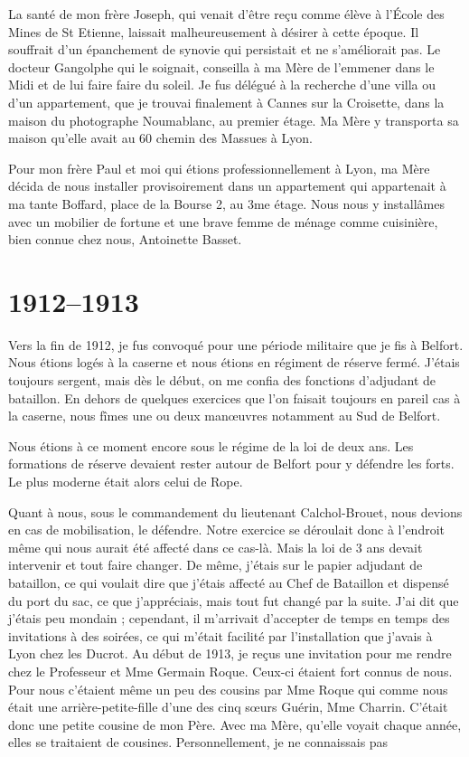 \documentclass[11pt,a4paper]{report}
\begin{document}
La santé de mon frère Joseph, qui venait d'être reçu comme élève à l'École des Mines de St Etienne, laissait malheureusement à désirer à cette époque. Il souffrait d'un épanchement de synovie qui persistait et ne s'améliorait pas. Le docteur Gangolphe qui le soignait, conseilla à ma Mère de l'emmener dans le Midi et de lui faire faire du soleil. Je fus délégué à la recherche d'une villa ou d'un appartement, que je trouvai finalement à Cannes sur la Croisette, dans la maison du photographe Noumablanc, au premier étage. Ma Mère y transporta sa maison qu'elle avait au 60 chemin des Massues à Lyon.

Pour mon frère Paul et moi qui étions professionnellement à Lyon, ma Mère décida de nous installer provisoirement dans un appartement qui appartenait à ma tante Boffard, place de la Bourse 2, au 3me étage. Nous nous y installâmes avec un mobilier de fortune et une brave femme de ménage comme cuisinière, bien connue chez nous, Antoinette Basset.

\chapter{1912--1913}

Vers la fin de 1912, je fus convoqué pour une période militaire que je fis à Belfort. Nous étions logés à la caserne et nous étions en régiment de réserve fermé. J'étais toujours sergent, mais dès le début, on me confia des fonctions d'adjudant de bataillon. En dehors de quelques exercices que l'on faisait toujours en pareil cas à la caserne, nous fîmes une ou deux manœuvres notamment au Sud de Belfort.

Nous étions à ce moment encore sous le régime de la loi de deux ans. Les formations de réserve devaient rester autour de Belfort pour y défendre les forts. Le plus moderne était alors celui de Rope.

Quant à nous, sous le commandement du lieutenant Calchol-Brouet, nous devions en cas de mobilisation, le défendre. Notre exercice se déroulait donc à l'endroit même qui nous aurait été affecté dans ce cas-là. Mais la loi de 3 ans devait intervenir et tout faire changer. De même, j'étais sur le papier adjudant de bataillon, ce qui voulait dire que j'étais affecté au Chef de Bataillon et dispensé du port du sac, ce que j'appréciais, mais tout fut changé par la suite. J'ai dit que j'étais peu mondain ; cependant, il m'arrivait d'accepter de temps en temps des invitations à des soirées, ce qui m'était facilité par l'installation que j'avais à Lyon chez les Ducrot. Au début de 1913, je reçus une invitation pour me rendre chez le Professeur et Mme Germain Roque. Ceux-ci étaient fort connus de nous. Pour nous c'étaient même un peu des cousins par Mme Roque qui comme nous était une arrière-petite-fille d'une des cinq sœurs Guérin, Mme Charrin. C'était donc une petite cousine de mon Père. Avec ma Mère, qu'elle voyait chaque année, elles se traitaient de cousines. Personnellement, je ne connaissais pas
\end{document}
